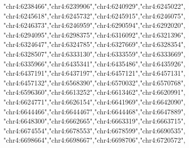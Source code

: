 \documentclass[
]{book}
\newenvironment{Shaded}{\begin{snugshade}}{\end{snugshade}}
\newcommand{\NormalTok}[1]{#1}
\newcommand{\StringTok}[1]{\textcolor[rgb]{0.31,0.60,0.02}{#1}}
\begin{document}
\begin{Shaded}
\begin{Highlighting}[]
                   \StringTok{"chr4:6238466"}\NormalTok{,}\StringTok{"chr4:6239906"}\NormalTok{,}\StringTok{"chr4:6240929"}\NormalTok{,}\StringTok{"chr4:6245022"}\NormalTok{,}
                   \StringTok{"chr4:6245618"}\NormalTok{,}\StringTok{"chr4:6245732"}\NormalTok{,}\StringTok{"chr4:6245915"}\NormalTok{,}\StringTok{"chr4:6246075"}\NormalTok{,}
                   \StringTok{"chr4:6246373"}\NormalTok{,}\StringTok{"chr4:6246959"}\NormalTok{,}\StringTok{"chr4:6290594"}\NormalTok{,}\StringTok{"chr4:6292020"}\NormalTok{,}
                   \StringTok{"chr4:6294095"}\NormalTok{,}\StringTok{"chr4:6298375"}\NormalTok{,}\StringTok{"chr4:6316092"}\NormalTok{,}\StringTok{"chr4:6321396"}\NormalTok{,}
                   \StringTok{"chr4:6324647"}\NormalTok{,}\StringTok{"chr4:6324785"}\NormalTok{,}\StringTok{"chr4:6327669"}\NormalTok{,}\StringTok{"chr4:6328354"}\NormalTok{,}
                   \StringTok{"chr4:6328507"}\NormalTok{,}\StringTok{"chr4:6333130"}\NormalTok{,}\StringTok{"chr4:6333559"}\NormalTok{,}\StringTok{"chr4:6333669"}\NormalTok{,}
                   \StringTok{"chr4:6335966"}\NormalTok{,}\StringTok{"chr4:6435341"}\NormalTok{,}\StringTok{"chr4:6435486"}\NormalTok{,}\StringTok{"chr4:6435926"}\NormalTok{,}
                   \StringTok{"chr4:6437191"}\NormalTok{,}\StringTok{"chr4:6437197"}\NormalTok{,}\StringTok{"chr4:6457121"}\NormalTok{,}\StringTok{"chr4:6457131"}\NormalTok{,}
                   \StringTok{"chr4:6457132"}\NormalTok{,}\StringTok{"chr4:6568390"}\NormalTok{,}\StringTok{"chr4:6570032"}\NormalTok{,}\StringTok{"chr4:6570768"}\NormalTok{,}
                   \StringTok{"chr4:6596360"}\NormalTok{,}\StringTok{"chr4:6613252"}\NormalTok{,}\StringTok{"chr4:6613462"}\NormalTok{,}\StringTok{"chr4:6620991"}\NormalTok{,}
                   \StringTok{"chr4:6624771"}\NormalTok{,}\StringTok{"chr4:6626154"}\NormalTok{,}\StringTok{"chr4:6641969"}\NormalTok{,}\StringTok{"chr4:6642090"}\NormalTok{,}
                   \StringTok{"chr4:6644466"}\NormalTok{,}\StringTok{"chr4:6644467"}\NormalTok{,}\StringTok{"chr4:6644468"}\NormalTok{,}\StringTok{"chr4:6647889"}\NormalTok{,}
                   \StringTok{"chr4:6648300"}\NormalTok{,}\StringTok{"chr4:6662665"}\NormalTok{,}\StringTok{"chr4:6663319"}\NormalTok{,}\StringTok{"chr4:6663715"}\NormalTok{,}
                   \StringTok{"chr4:6674554"}\NormalTok{,}\StringTok{"chr4:6678553"}\NormalTok{,}\StringTok{"chr4:6678599"}\NormalTok{,}\StringTok{"chr4:6690535"}\NormalTok{,}
                   \StringTok{"chr4:6698664"}\NormalTok{,}\StringTok{"chr4:6698667"}\NormalTok{,}\StringTok{"chr4:6698706"}\NormalTok{,}\StringTok{"chr4:6720572"}\NormalTok{,}

\end{Highlighting}
\end{Shaded}
\end{document}
